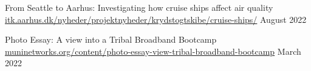 \begin{cventries}

\cvpub
    {From Seattle to Aarhus: Investigating how cruise ships affect air quality} %
    {\href{https://itk.aarhus.dk/nyheder/projektnyheder/krydstogtskibe/cruise-ships/}{itk.aarhus.dk/nyheder/projektnyheder/krydstogtskibe/cruise-ships/}} %
    {} %
    {August 2022} %


\cvpub
    {Photo Essay: A view into a Tribal Broadband Bootcamp} %
    {\href{https://muninetworks.org/content/photo-essay-view-tribal-broadband-bootcamp}{muninetworks.org/content/photo-essay-view-tribal-broadband-bootcamp}} %
    {} %
    {March 2022} %

\end{cventries}
